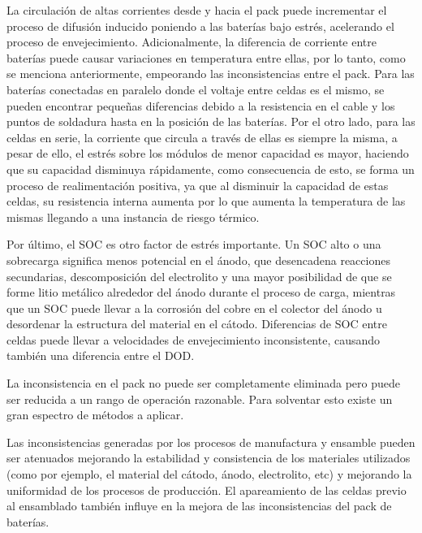 \documentclass[10pt,a4paper]{article}
\newcounter{subsubsubsection}[subsubsection]
\begin{document}
La circulaci\'on de altas corrientes desde y hacia el pack puede incrementar el
proceso de difusi\'on inducido poniendo a las bater\'ias bajo estr\'es, 
acelerando el proceso de envejecimiento. Adicionalmente, la diferencia
de corriente entre bater\'ias puede causar variaciones en temperatura entre
ellas, por lo tanto, como se menciona anteriormente, empeorando las
inconsistencias entre el pack. Para las bater\'ias conectadas en paralelo donde
el voltaje entre celdas es el mismo, se pueden encontrar pequeñas diferencias
debido a la resistencia en el cable y los puntos de soldadura hasta en la
posici\'on de las bater\'ias. Por el otro lado, para las celdas en serie, la
corriente que circula a trav\'es de ellas es siempre la misma, a pesar de ello,
el estr\'es sobre los m\'odulos de menor capacidad es mayor, haciendo que su
capacidad disminuya r\'apidamente, como consecuencia de esto, se forma un
proceso de realimentaci\'on positiva, ya que al disminuir la capacidad de estas
celdas, su resistencia interna aumenta por lo que aumenta la temperatura de las
mismas llegando a una instancia de riesgo t\'ermico.

Por \'ultimo, el \acrshort{SOC} es otro factor de estr\'es importante. Un
\acrshort{SOC} alto o una sobrecarga significa menos potencial en el \'anodo,
que desencadena reacciones secundarias, descomposici\'on del electrolito y una
mayor posibilidad de que se forme litio met\'alico alrededor del \'anodo 
durante el proceso de carga, mientras que un \acrshort{SOC} puede llevar a la 
corrosi\'on del cobre en el colector del \'anodo u desordenar la estructura del 
material en el c\'atodo. Diferencias de \acrshort{SOC} entre celdas puede llevar 
a velocidades de envejecimiento inconsistente, causando tambi\'en una diferencia 
entre el \acrshort{DOD}.


La inconsistencia en el pack no puede ser completamente eliminada pero puede ser
reducida a un rango de operaci\'on razonable. Para solventar esto existe un gran
espectro de m\'etodos a aplicar.

Las inconsistencias generadas por los procesos de manufactura y ensamble pueden
ser atenuados mejorando la estabilidad y consistencia de los materiales
utilizados (como por ejemplo, el material del c\'atodo, \'anodo, electrolito,
etc) y mejorando la uniformidad de los procesos de producci\'on. El apareamiento
de las celdas previo al ensamblado tambi\'en influye en la mejora de las
inconsistencias del pack de bater\'ias.
\end{document}
